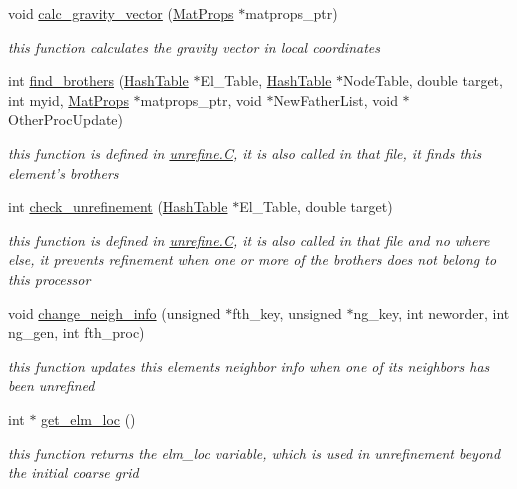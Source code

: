 \begin{CompactItemize}
void \hyperlink{classElement_a97}{calc\_\-gravity\_\-vector} (\hyperlink{structMatProps}{Mat\-Props} $\ast$matprops\_\-ptr)
\begin{CompactList}\small\item\em this function calculates the gravity vector in local coordinates \item\end{CompactList}\item 
int \hyperlink{classElement_a98}{find\_\-brothers} (\hyperlink{classHashTable}{Hash\-Table} $\ast$El\_\-Table, \hyperlink{classHashTable}{Hash\-Table} $\ast$Node\-Table, double target, int myid, \hyperlink{structMatProps}{Mat\-Props} $\ast$matprops\_\-ptr, void $\ast$New\-Father\-List, void $\ast$Other\-Proc\-Update)
\begin{CompactList}\small\item\em this function is defined in \hyperlink{constant_8h_a21}{unrefine.C}, it is also called in that file, it finds this element's brothers \item\end{CompactList}\item 
int \hyperlink{classElement_a99}{check\_\-unrefinement} (\hyperlink{classHashTable}{Hash\-Table} $\ast$El\_\-Table, double target)
\begin{CompactList}\small\item\em this function is defined in \hyperlink{constant_8h_a21}{unrefine.C}, it is also called in that file and no where else, it prevents refinement when one or more of the brothers does not belong to this processor \item\end{CompactList}\item 
void \hyperlink{classElement_a100}{change\_\-neigh\_\-info} (unsigned $\ast$fth\_\-key, unsigned $\ast$ng\_\-key, int neworder, int ng\_\-gen, int fth\_\-proc)
\begin{CompactList}\small\item\em this function updates this elements neighbor info when one of its neighbors has been unrefined \item\end{CompactList}\item 
int $\ast$ \hyperlink{classElement_a101}{get\_\-elm\_\-loc} ()
\begin{CompactList}\small\item\em this function returns the elm\_\-loc variable, which is used in unrefinement beyond the initial coarse grid \item\end{CompactList}\item 

\end{CompactItemize}
